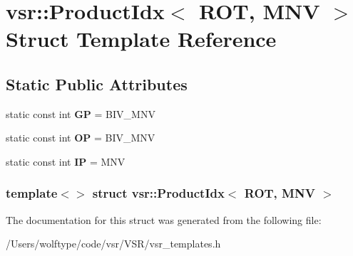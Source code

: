\hypertarget{structvsr_1_1_product_idx_3_01_r_o_t_00_01_m_n_v_01_4}{\section{vsr\-:\-:Product\-Idx$<$ R\-O\-T, M\-N\-V $>$ Struct Template Reference}
\label{structvsr_1_1_product_idx_3_01_r_o_t_00_01_m_n_v_01_4}
}
\subsection*{Static Public Attributes}
\begin{DoxyCompactItemize}
\item 
\hypertarget{structvsr_1_1_product_idx_3_01_r_o_t_00_01_m_n_v_01_4_a975bf16a025643f6d7d6f40890974836}{static const int {\bfseries G\-P} = B\-I\-V\-\_\-\-M\-N\-V}\label{structvsr_1_1_product_idx_3_01_r_o_t_00_01_m_n_v_01_4_a975bf16a025643f6d7d6f40890974836}

\item 
\hypertarget{structvsr_1_1_product_idx_3_01_r_o_t_00_01_m_n_v_01_4_a6b5bcbe421971cd2612873f94f04ee5a}{static const int {\bfseries O\-P} = B\-I\-V\-\_\-\-M\-N\-V}\label{structvsr_1_1_product_idx_3_01_r_o_t_00_01_m_n_v_01_4_a6b5bcbe421971cd2612873f94f04ee5a}

\item 
\hypertarget{structvsr_1_1_product_idx_3_01_r_o_t_00_01_m_n_v_01_4_a3be5aaf62287625696a28091b8378e0b}{static const int {\bfseries I\-P} = M\-N\-V}\label{structvsr_1_1_product_idx_3_01_r_o_t_00_01_m_n_v_01_4_a3be5aaf62287625696a28091b8378e0b}

\end{DoxyCompactItemize}
\subsubsection*{template$<$$>$ struct vsr\-::\-Product\-Idx$<$ R\-O\-T, M\-N\-V $>$}



The documentation for this struct was generated from the following file\-:\begin{DoxyCompactItemize}
\item 
/\-Users/wolftype/code/vsr/\-V\-S\-R/vsr\-\_\-templates.\-h\end{DoxyCompactItemize}
